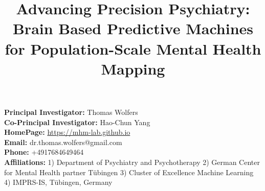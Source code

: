 \documentclass[11pt]{article}
\title{Advancing Precision Psychiatry: Brain Based Predictive Machines for Population-Scale Mental Health Mapping}
\author{}
\date{\vspace{-6em}}
\begin{document}
\maketitle
\noindent
\textbf{Principal Investigator:} Thomas Wolfers \\
\textbf{Co-Principal Investigator:} Hao-Chun Yang \\
\textbf{HomePage:} \url{https://mhm-lab.github.io} \\
\textbf{Email:} dr.thomas.wolfers@gmail.com \\
\textbf{Phone:} +4917684649464 \\
\textbf{Affiliations:} 1) Department of Psychiatry and Psychotherapy 2) German Center for Mental Health partner Tübingen 3) Cluster of Excellence Machine Learning 4) IMPRS-IS, Tübingen, Germany








\begingroup
\setlength{\bibsep}{0\baselineskip}
\small{} %
\endgroup
\end{document}
